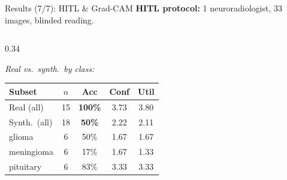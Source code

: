 \documentclass[aspectratio=169]{beamer}
\begin{document}
\begin{frame}{Results (7/7): HITL \& Grad-CAM}
  \footnotesize
  \textbf{HITL protocol:} 1 neuroradiologist, 33 images, blinded reading.

  \vspace{0.2em}
  \begin{columns}[T]
    \begin{column}{0.34\textwidth}
      \begin{minipage}[t][2.9cm][t]{\linewidth}
      \textit{\scriptsize Real vs.\ synth.\ by class:}\\[3pt]
      \tiny
      \begin{tabular*}{\linewidth}{@{\extracolsep{\fill}}lcccc}
        \toprule
        Subset & $n$ & Acc & Conf & Util \\
        \midrule
        Real (all)              & 15 & \textbf{100\%} & 3.73 & 3.80 \\
        Synth.\ (all)           & 18 & \textbf{50\%}  & 2.22 & 2.11 \\
        \;glioma                & 6  & 50\%           & 1.67 & 1.67 \\
        \;meningioma            & 6  & \textcolor{myred}{17\%} & 1.67 & 1.33 \\
        \;pituitary             & 6  & 83\%           & 3.33 & 3.33 \\
        \bottomrule
      \end{tabular*}
      \end{minipage}


\end{column}
\end{columns}
\end{frame}
\end{document}
